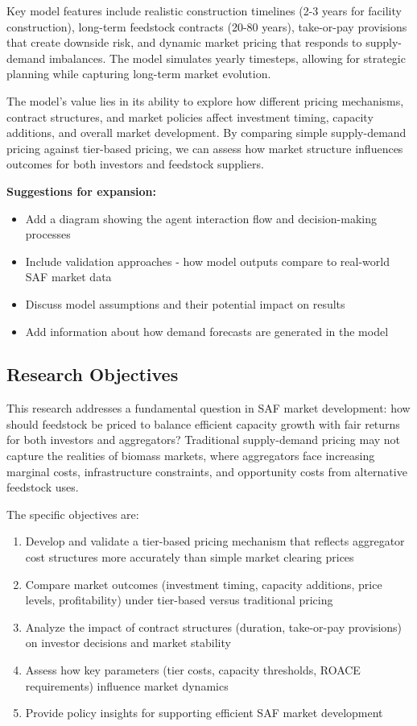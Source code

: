 \documentclass[10.5pt]{article}
\begin{document}
Key model features include realistic construction timelines (2-3 years for facility construction), long-term feedstock contracts (20-80 years), take-or-pay provisions that create downside risk, and dynamic market pricing that responds to supply-demand imbalances. The model simulates yearly timesteps, allowing for strategic planning while capturing long-term market evolution.

The model's value lies in its ability to explore how different pricing mechanisms, contract structures, and market policies affect investment timing, capacity additions, and overall market development. By comparing simple supply-demand pricing against tier-based pricing, we can assess how market structure influences outcomes for both investors and feedstock suppliers.

\textbf{Suggestions for expansion:}
\begin{itemize}
    \item Add a diagram showing the agent interaction flow and decision-making processes
    \item Include validation approaches - how model outputs compare to real-world SAF market data
    \item Discuss model assumptions and their potential impact on results
    \item Add information about how demand forecasts are generated in the model
\end{itemize}

\subsection{Research Objectives}

This research addresses a fundamental question in SAF market development: how should feedstock be priced to balance efficient capacity growth with fair returns for both investors and aggregators? Traditional supply-demand pricing may not capture the realities of biomass markets, where aggregators face increasing marginal costs, infrastructure constraints, and opportunity costs from alternative feedstock uses.

The specific objectives are:

\begin{enumerate}
    \item Develop and validate a tier-based pricing mechanism that reflects aggregator cost structures more accurately than simple market clearing prices
    \item Compare market outcomes (investment timing, capacity additions, price levels, profitability) under tier-based versus traditional pricing
    \item Analyze the impact of contract structures (duration, take-or-pay provisions) on investor decisions and market stability
    \item Assess how key parameters (tier costs, capacity thresholds, ROACE requirements) influence market dynamics
    \item Provide policy insights for supporting efficient SAF market development
\end{enumerate}
\end{document}
